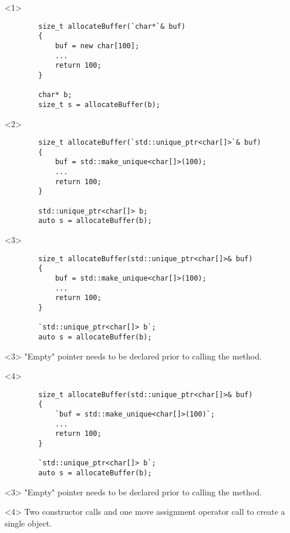\documentclass{beamer}
\begin{document}
\begin{frame}[fragile,t]
	\begin{onlyenv}
	\begin{lstlisting}
		size_t allocateBuffer(`char*`& buf)
		{
			buf = new char[100];
			...
			return 100;
		}
		
		char* b;
		size_t s = allocateBuffer(b);
	\end{lstlisting}
	\end{onlyenv}

	\begin{onlyenv}
	\begin{lstlisting}
		size_t allocateBuffer(`std::unique_ptr<char[]>`& buf)
		{
			buf = std::make_unique<char[]>(100);
			...
			return 100;
		}
		
		std::unique_ptr<char[]> b;
		auto s = allocateBuffer(b);
	\end{lstlisting}
	\end{onlyenv}
	
	\begin{onlyenv}
	\begin{lstlisting}
		size_t allocateBuffer(std::unique_ptr<char[]>& buf)
		{
			buf = std::make_unique<char[]>(100);
			...
			return 100;
		}
		
		`std::unique_ptr<char[]> b`;
		auto s = allocateBuffer(b);
	\end{lstlisting}

	\begin{block}{}<3>
		"Empty" pointer needs to be declared prior to calling the method.
	\end{block}
	\end{onlyenv}
	
	\begin{onlyenv}
	\begin{lstlisting}
		size_t allocateBuffer(std::unique_ptr<char[]>& buf)
		{
			`buf = std::make_unique<char[]>(100)`;
			...
			return 100;
		}
		
		`std::unique_ptr<char[]> b`;
		auto s = allocateBuffer(b);
	\end{lstlisting}

	\begin{block}{}<3>
		"Empty" pointer needs to be declared prior to calling the method.
	\end{block}
	\begin{block}{}<4>
		Two constructor calls and one move assignment operator call to create a single object.
	\end{block}	
	

\end{onlyenv}
\end{frame}
\end{document}
